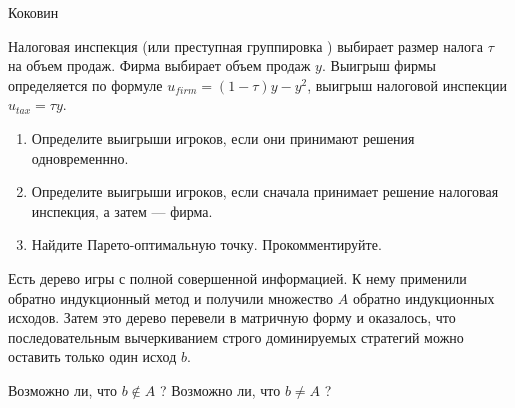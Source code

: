 \begin{problem}
\begin{source}
Коковин
\end{source}
Налоговая инспекция (или преступная группировка ) выбирает размер
налога $\tau$ на объем продаж. Фирма выбирает объем продаж $y$.
Выигрыш фирмы определяется по формуле $u_{firm}=(1-\tau)y-y^{2}$,
выигрыш налоговой инспекции $u_{tax}=\tau y$. \par
\begin{enumerate}
\item  Определите выигрыши игроков, если они принимают решения
одновременнно. \par
\item Определите выигрыши игроков, если сначала принимает решение
налоговая инспекция, а затем --- фирма. \par
\item  Найдите Парето-оптимальную точку. Прокомментируйте.
\end{enumerate}


\begin{sol}

\end{sol}
\end{problem}






\begin{problem}
Есть дерево игры с полной совершенной информацией. К нему применили обратно индукционный метод и получили множество  $A$  обратно индукционных исходов. Затем это дерево перевели в матричную форму и оказалось, что последовательным вычеркиванием строго доминируемых стратегий можно оставить только один исход  $b$.\par
Возможно ли, что  $b\notin A$ ? Возможно ли, что  $b\ne A$ ?\par



\begin{sol}

\end{sol}
\end{problem}




